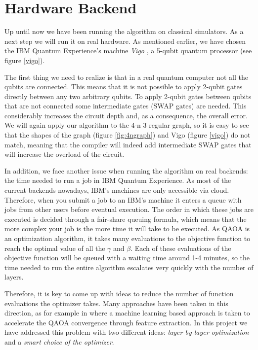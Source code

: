 \section{Hardware Backend}
\label{hardware_section}

Up until now we have been running the algorithm on classical simulators. As a next step we will run it on real hardware. As mentioned earlier, we have chosen the IBM Quantum Experience's machine \textit{Vigo} \cite{vigo_ref}, a 5-qubit quantum processor (see figure \ref{vigo}). 

The first thing we need to realize is that in a real quantum computer not all the qubits are connected. This means that it is not possible to apply 2-qubit gates directly between any two arbitrary qubits. To apply 2-qubit gates between qubits that are not connected some intermediate gates (SWAP gates) are needed. This considerably increases the circuit depth and, as a consequence, the overall error. We will again apply our algorithm to the 4-n 3 regular graph, so it is easy to see that the shapes of the graph (figure \ref{fig:4ngraph}) and Vigo (figure \ref{vigo}) do not match, meaning that the compiler will indeed add intermediate SWAP gates that will increase the overload of the circuit.


In addition, we face another issue when running the algorithm on real backends: the time needed to run a job in IBM Quantum Experience. As most of the current backends nowadays, IBM's machines are only accessible via cloud. Therefore, when you submit a job to an IBM's machine it enters a queue with jobs from other users before eventual execution. The order in which these jobs are executed is decided through a fair-share queuing formula, which means that the more complex your job is the more time it will take to be executed. As QAOA is an optimization algorithm, it takes many evaluations to the objective function to reach the optimal value of all the $\gamma$ and $\beta$. Each of these evaluations of the objective function will be queued with a waiting time around 1-4 minutes, so the time needed to run the entire algorithm escalates very quickly with the number of layers.

Therefore, it is key to come up with ideas to reduce the number of function evaluations the optimizer takes. Many approaches have been taken in this direction, as for example in \cite{alam2020accelerating} where a machine  learning based approach is taken to accelerate the QAOA convergence through feature extraction. In this project we have addressed this problem with two different ideas: \textit{layer by layer optimization} and a \textit{smart choice of the optimizer}. 



